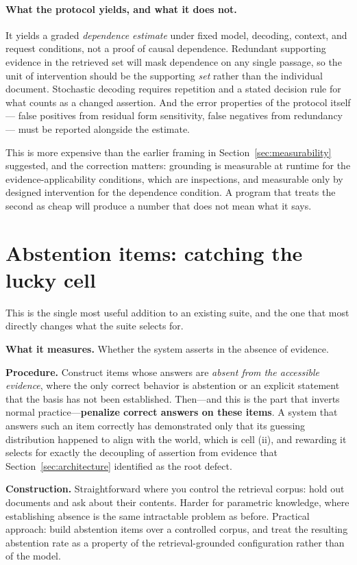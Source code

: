 \paragraph{What the protocol yields, and what it does not.} It yields a graded
\emph{dependence estimate} under fixed model, decoding, context, and request
conditions, not a proof of causal dependence. Redundant supporting evidence in the
retrieved set will mask dependence on any single passage, so the unit of intervention
should be the supporting \emph{set} rather than the individual document. Stochastic
decoding requires repetition and a stated decision rule for what counts as a changed
assertion. And the error properties of the protocol itself --- false positives from
residual form sensitivity, false negatives from redundancy --- must be reported
alongside the estimate.

This is more expensive than the earlier framing in
Section~\ref{sec:measurability} suggested, and the correction matters: grounding is
measurable at runtime for the evidence-applicability conditions, which are inspections,
and measurable only by designed intervention for the dependence condition. A program
that treats the second as cheap will produce a number that does not mean what it says.

\section{Abstention items: catching the lucky cell}
\label{sec:abstention}

This is the single most useful addition to an existing suite, and the one that
most directly changes what the suite selects for.

\textbf{What it measures.} Whether the system asserts in the absence of evidence.

\textbf{Procedure.} Construct items whose answers are \emph{absent from the
accessible evidence}, where the only correct behavior is abstention or an explicit
statement that the basis has not been established. Then---and this is the
part that inverts normal practice---\textbf{penalize correct answers on these
items}. A system that answers such an item correctly has demonstrated only that
its guessing distribution happened to align with the world, which is cell (ii),
and rewarding it selects for exactly the decoupling of assertion from evidence
that Section~\ref{sec:architecture} identified as the root defect.

\textbf{Construction.} Straightforward where you control the retrieval corpus:
hold out documents and ask about their contents. Harder for parametric knowledge,
where establishing absence is the same intractable problem as before. Practical
approach: build abstention items over a controlled corpus, and treat the resulting
abstention rate as a property of the retrieval-grounded configuration rather than
of the model.

